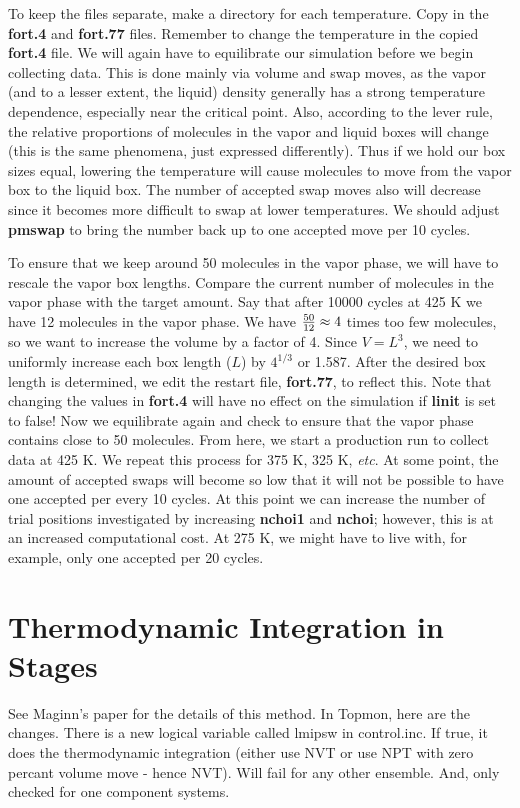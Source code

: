 \documentclass[12pt,letterpaper]{article}
\begin{document}
{{{{{{{\noindent To keep the files separate, make a directory for each
temperature.  Copy in the {\bf fort.4} and {\bf fort.77} files. 
Remember to change the temperature in the copied {\bf fort.4} file.  We
will again have to equilibrate our simulation before we begin
collecting data.  This is done mainly via volume and swap moves, as the
vapor (and to a lesser extent, the liquid) density generally has a strong
temperature dependence, especially near the critical point.  Also, according to the 
lever rule, the relative proportions of molecules in the
vapor and liquid boxes will change (this is the same phenomena, just
expressed differently).  Thus if we hold our box sizes equal,
lowering the temperature will cause molecules to move from the vapor box to the liquid box.  
The number of accepted swap moves also will decrease since it becomes more difficult 
to swap at lower temperatures.  We should adjust {\bf pmswap} to bring the number back up to one
accepted move per 10 cycles.  

\noindent To ensure that we keep around 50 molecules in the vapor
phase, we will have to rescale the vapor box lengths.  
Compare the current number of molecules in the
vapor phase with the target amount.  Say that after 10000 cycles at
425 K we have 12 molecules in the vapor phase.  We have ${{50}
\over {12}} \approx 4$ times too few molecules, so we want to increase
the volume by a factor of 4.  Since $V=L^3$, we need to uniformly
increase each box length ($L$) by $4^{1/3}$ or 1.587.  After the desired box length
is determined, we edit the restart file, {\bf fort.77}, to reflect this.  
Note that changing the values in {\bf fort.4} will have no effect on the simulation
if {\bf linit} is set to false!  
Now we equilibrate again and check to ensure that the vapor phase contains close to 50 molecules.  
From here, we start a production run to collect data at 425 K.  We repeat this process for 375 K, 325 K, {\it etc}.  
At some point, the amount of accepted swaps will become so low
that it will not be possible to have one accepted per every 10 cycles.  
At this point we can increase the number of trial positions investigated by increasing {\bf
nchoi1} and {\bf nchoi}; however, this is at an increased computational cost.  At
275 K, we might have to live with, for example, only one accepted per 20 cycles.

\section{Thermodynamic Integration in Stages} 
See Maginn's paper for the details of this method.  In Topmon, here are the
changes. There is a new logical variable called lmipsw in control.inc.
If true, it does the thermodynamic integration (either use NVT or use
NPT with zero percant volume move - hence NVT). Will fail for
any other ensemble. And, only checked for one component systems.

}}}}}}}
\end{document}
